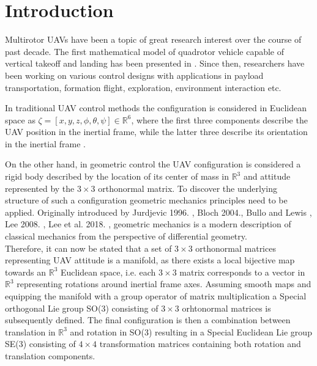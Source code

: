\section{Introduction}

Multirotor UAVs have been a topic of great research interest over the course of past decade. The first mathematical model of quadrotor vehicle capable of vertical takeoff and landing has been presented in \cite{hamel2002quad}. Since then, researchers have been working on various control designs with applications in payload transportation, formation flight, exploration, environment interaction etc.

In traditional UAV control methods the configuration is considered in Euclidean space as $\zeta = [x, y, z, \phi, \theta, \psi] \in \mathbb{R}^6$, where the first three components describe the UAV position in the inertial frame, while the latter three describe its orientation in the inertial frame \cite{uavModel}.

On the other hand, in geometric control the UAV configuration is considered a rigid body described by the location of its center of mass in $\mathbb{R}^3$ and attitude represented by the $3\times3$ orthonormal matrix. To discover the underlying structure of such a configuration geometric mechanics principles need to be applied. Originally introduced by Jurdjevic 1996. \cite{jurdjevic_1996}, Bloch 2004.\cite{bloch}, Bullo and Lewis \cite{bulloBook}, Lee 2008. \cite{Lee2008ComputationalGM}, Lee et al. 2018. \cite{LeeModel}, geometric mechanics is a modern description of classical mechanics from the perspective of differential geometry. \\
Therefore, it can now be stated that a set of $3\times3$ orthonormal matrices representing UAV attitude is a manifold, as there exists a local bijective map towards an $\mathbb{R}^3$ Euclidean space, i.e. each $3\times3$ matrix corresponds to a vector in $\mathbb{R}^3$ representing rotations around inertial frame axes. Assuming smooth maps and equipping the manifold with a group operator of matrix multiplication a Special orthogonal Lie group SO(3) consisting of $3\times3$ orhtonormal matrices is subsequently defined. The final configuration is then a combination between translation in $\mathbb{R}^3$ and rotation in SO(3) resulting in a Special Euclidean Lie group SE(3) consisting of $4\times4$ transformation matrices containing both rotation and translation components.

